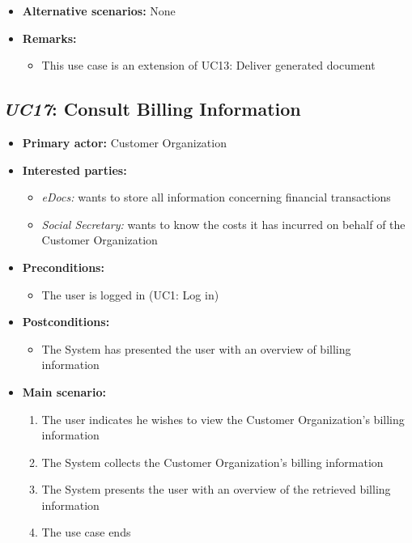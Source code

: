 \documentclass[a4paper,10pt]{article}
\begin{document}
\begin{itemize}
    \item \textbf{Alternative scenarios:} 
    None
    
    \item \textbf{Remarks:}
        \begin{itemize}
          \item  This use case is an extension of UC13: Deliver generated document
        \end{itemize}
\end{itemize}

\subsection{\emph{UC17}: Consult Billing Information}
\begin{itemize}
	\item \textbf{Primary actor:} Customer Organization
	\item \textbf{Interested parties:} 
	\begin{itemize}
		\item \textit{eDocs:} wants to store all information concerning financial transactions
		\item \textit{Social Secretary:} wants to know the costs it has incurred on behalf of the Customer Organization
	\end{itemize}
	
	\item \textbf{Preconditions:}
	\begin{itemize}
		\item The user is logged in (UC1: Log in)
	\end{itemize}
	
	\item \textbf{Postconditions:}
	\begin{itemize}
		\item The System has presented the user with an overview of billing information
	\end{itemize}
	
	\item \textbf{Main scenario:} 
	\begin{enumerate}
		\item The user indicates he wishes to view the Customer Organization's billing information
		\item The System collects the Customer Organization's billing information
		\item The System presents the user with an overview of the retrieved billing information
		\item The use case ends
	\end{enumerate}
	

\end{itemize}
\end{document}
